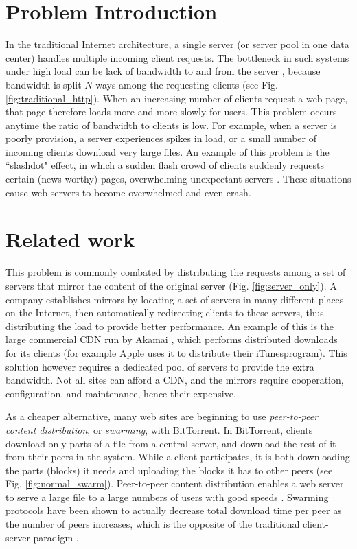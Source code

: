 \section {Problem Introduction}
In the traditional Internet architecture, a single server (or server pool in one data center) handles multiple incoming client requests.  
The bottleneck in such systems under high load can be lack of bandwidth to and from the server \cite{coopnet}, because bandwidth is split $N$ 
ways among the requesting clients (see Fig. \ref{fig:traditional_http}).  When an increasing number of clients request a web page, that page 
therefore loads more and more slowly for users.  This problem occurs anytime the ratio of bandwidth to clients is low.  For example, when a server 
is poorly provision, a server experiences spikes in load, or a small number of incoming clients download very large files.  An example of this problem 
is the ``slashdot" effect, in which a sudden flash crowd of clients suddenly requests certain (news-worthy) pages, overwhelming unexpectant servers
.  These situations cause web servers to become overwhelmed and even crash.

\section {Related work}
This problem is commonly combated by distributing the requests among a set of servers that mirror the content of the original server (Fig. \ref{fig:server_only}).  
A company establishes mirrors by locating a set of servers in many different places on the Internet, then automatically redirecting clients to these servers, thus 
distributing the load to provide better performance.  An example of this is the large commercial CDN run by Akamai \cite{akamai}, which performs distributed
downloads for its clients (for example Apple uses it to distribute their iTunes\texttrademark  program).  This solution however requires a dedicated pool of 
servers to provide the extra bandwidth.  Not all sites can afford a CDN, and the mirrors require cooperation, configuration, and maintenance, hence their expensive.

As a cheaper alternative, many web sites are beginning to use \emph{peer-to-peer content distribution}, or \emph{swarming}, with BitTorrent.  In BitTorrent, clients 
download only parts of a file from a central server, and download the rest of it from their peers in the system.  While a client participates, it is both downloading 
the parts (blocks) it needs and uploading the blocks it has to other peers (see Fig. \ref{fig:normal_swarm}).  Peer-to-peer content distribution enables a 
web server to serve a large file to a large numbers of users with good speeds \cite{zappala}. Swarming protocols have been shown to actually decrease total download 
time per peer as the number of peers increases, which is the opposite of the traditional client-server paradigm \cite{slurpie}. 

